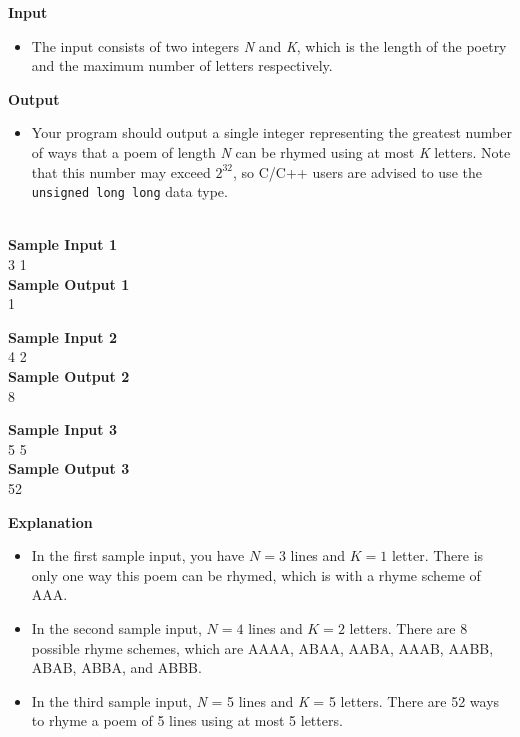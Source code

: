 \documentclass{article}
\begin{document}
\textbf{Input}
\begin{itemize}
	\item The input consists of two integers \emph{N} and \emph{K}, which is the length of the poetry and the maximum number of letters respectively.
\end{itemize} 

\textbf{Output}
\begin{itemize}
	\item Your program should output a single integer representing the greatest number of ways that a poem of length \emph{N} can be rhymed using at most \emph{K} letters. Note that this number may exceed $2^{32}$, so C/C++ users are advised to use the \texttt{unsigned long long} data type. \\
	\ \\
\end{itemize} 

\begin{minipage} [b] {0.333\textwidth}
	\textbf{Sample Input 1} \\
	3 1\\

	\textbf{Sample Output 1} \\
	1 \\
\end{minipage} %
\begin{minipage} [b] {0.333\textwidth}
	\textbf{Sample Input 2} \\
	4 2\\

	\textbf{Sample Output 2} \\
	8 \\
\end{minipage} %
\begin{minipage} [b] {0.333\textwidth}
	\textbf{Sample Input 3} \\
	5 5\\

	\textbf{Sample Output 3} \\
	52 \\
\end{minipage}

\textbf{Explanation}
\begin{itemize}
	\item In the first sample input, you have $N = 3$ lines and $K = 1$ letter. There is only one way this poem can be rhymed, which is with a rhyme scheme of AAA. 
	\item In the second sample input, $N = 4$ lines and $K = 2$ letters. There are 8 possible rhyme schemes, which are AAAA, ABAA, AABA, AAAB, AABB, ABAB, ABBA, and ABBB.
	\item In the third sample input, \emph{N} = 5 lines and \emph{K} = 5 letters. There are 52 ways to rhyme a poem of 5 lines using at most 5 letters.\\
\end{itemize}
\end{document}
